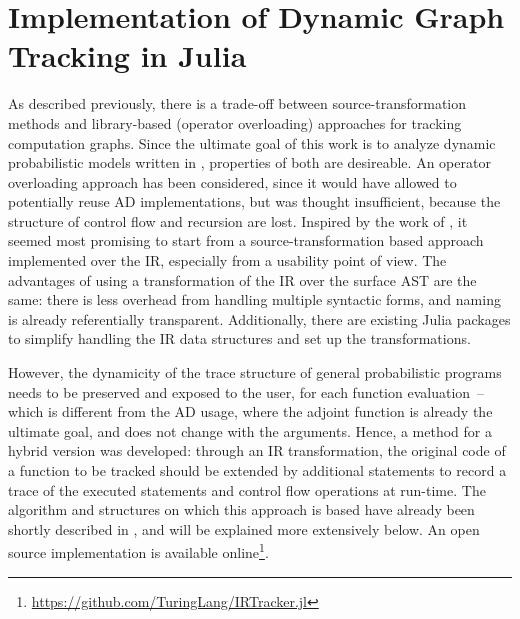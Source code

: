 \chapter{Implementation of Dynamic Graph Tracking in Julia}
\label{cha:impl-dynam-graph}

As described previously, there is a trade-off between source-transformation methods and
library-based (operator overloading) approaches for tracking computation graphs.  Since the ultimate
goal of this work is to analyze dynamic probabilistic models written in \turingjl{}, properties of
both are desireable.  An operator overloading approach has been considered, since it would have
allowed to potentially reuse AD implementations, but was thought insufficient, because the structure
of control flow and recursion are lost.  Inspired by the work of \textcite{innes2018don}, it seemed
most promising to start from a source-transformation based approach implemented over the IR,
especially from a usability point of view.  The advantages of using a transformation of the IR over
the surface AST are the same: there is less overhead from handling multiple syntactic forms, and
naming is already referentially transparent.  Additionally, there are existing Julia packages to
simplify handling the IR data structures and set up the transformations.

However, the dynamicity of the trace structure of general probabilistic programs needs to be
preserved and exposed to the user, for each function evaluation~-- which is different from the AD
usage, where the adjoint function is already the ultimate goal, and does not change with the
arguments.  Hence, a method for a hybrid version was developed: through an IR transformation, the
original code of a function to be tracked should be extended by additional statements to record a
trace of the executed statements and control flow operations at run-time.  The algorithm and
structures on which this approach is based have already been shortly described in
\textcite{gabler2019graph}, and will be explained more extensively below.  An open source
implementation is available
online\footnote{\protect\url{https://github.com/TuringLang/IRTracker.jl}}.

